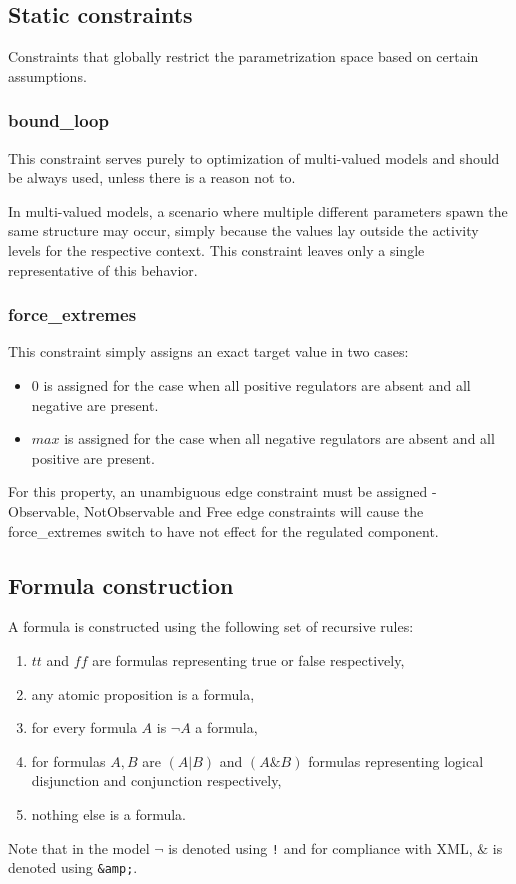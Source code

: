 \documentclass[12pt]{article}
\begin{document}
\subsection{Static constraints}
\label{StaticConstraints}
Constraints that globally restrict the parametrization space based on certain assumptions.
\subsubsection{bound\_loop}
This constraint serves purely to optimization of multi-valued models and should be always used, unless there is a reason not to.

In multi-valued models, a scenario where multiple different parameters spawn the same structure may occur, simply because the values lay outside the activity levels for the respective context. This constraint leaves only a single representative of this behavior.

\subsubsection{force\_extremes}
This constraint simply assigns an exact target value in two cases:
\begin{itemize}
\item $0$ is assigned for the case when all positive regulators are absent and all negative are present.
 \item $max$ is assigned for the case when all negative regulators are absent and all positive are present.
\end{itemize}
For this property, an unambiguous edge constraint must be assigned - Observable, NotObservable and Free edge constraints will cause the force\_extremes switch to have not effect for the regulated component.

\subsection{Formula construction}
\label{FormulaConstruction}
A formula is constructed using the following set of recursive rules:
\begin{enumerate}
\item $tt$ and $ff$ are formulas representing true or false respectively,
\item any atomic proposition is a formula,
\item for every formula $A$ is $\neg A$ a formula,
\item for formulas $A,B$ are $(A|B)$ and $(A\&B)$ formulas representing logical disjunction and conjunction respectively,
\item nothing else is a formula.
\end{enumerate}
Note that in the model $\neg$ is denoted using \texttt{!} and for compliance with XML, $\&$ is denoted using \texttt{\&amp;}.
\end{document}
